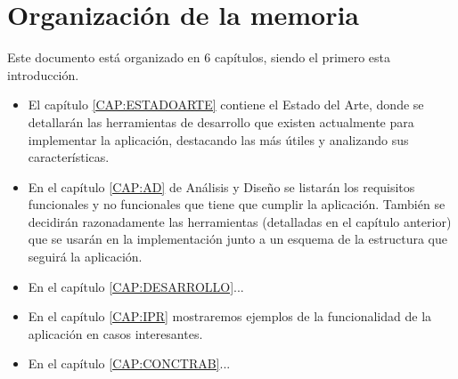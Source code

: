   \section{Organización de la memoria\label{SEC:ORGANIZACION}}
    Este documento está organizado en 6 capítulos, siendo el primero esta introducción. 
        \begin{itemize}
      \item El capítulo \ref{CAP:ESTADOARTE} contiene el Estado del Arte, donde se detallarán las herramientas de desarrollo que existen actualmente para implementar la aplicación, destacando las más útiles y analizando sus características.
      \item En el capítulo \ref{CAP:AD} de Análisis y Diseño se listarán los requisitos funcionales y no funcionales que tiene que cumplir la aplicación. También se decidirán razonadamente las herramientas (detalladas en el capítulo anterior) que se usarán en la implementación junto a un esquema de la estructura que seguirá la aplicación.
      \item En el capítulo \ref{CAP:DESARROLLO}...
      \item En el capítulo \ref{CAP:IPR} mostraremos ejemplos de la funcionalidad de la aplicación en casos interesantes.
      \item En el capítulo \ref{CAP:CONCTRAB}...
    \end{itemize}
    
    
